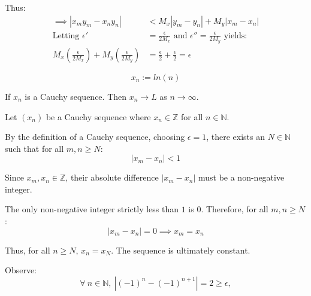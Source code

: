 		Thus:
		\begin{align*}
			\implies |x_m y_m - x_n y_n|                                                    & < M_x |y_m-y_n| + M_y |x_m-x_n|                                                          \\
			\text{Letting } \epsilon'                                                       & = \frac{\epsilon}{2M_x} \text{ and } \epsilon'' = \frac{\epsilon}{2M_y} \text{ yields: } \\
			M_x \left(\frac{\epsilon}{2M_x}\right) + M_y \left(\frac{\epsilon}{2M_y}\right) & = \frac{\epsilon}{2} + \frac{\epsilon}{2} = \epsilon
		\end{align*}

	\[ x_n := ln(n) \] 


If $x_n$ is a Cauchy sequence. Then $x_n \rightarrow L$ as $n \rightarrow \infty$.



Let $(x_n)$ be a Cauchy sequence where $x_n \in \mathbb{Z}$ for all $n \in \mathbb{N}$.

By the definition of a Cauchy sequence, choosing $\epsilon = 1$, there exists an $N \in \mathbb{N}$ such that for all $m, n \ge N$:
$$|x_m - x_n| < 1$$

Since $x_m, x_n \in \mathbb{Z}$, their absolute difference $|x_m - x_n|$ must be a non-negative integer. 

The only non-negative integer strictly less than $1$ is $0$. Therefore, for all $m, n \ge N$:
$$|x_m - x_n| = 0 \implies x_m = x_n$$

Thus, for all $n \ge N$, $x_n = x_N$. The sequence is ultimately constant.



	Observe:
	\[
		\forall~ n \in \mathbb{N}, ~|(-1)^{n} - (-1)^{n+1}| = 2 \geq \epsilon,
	\]

